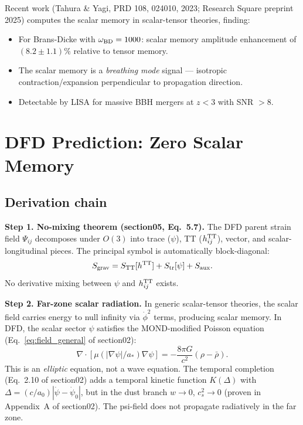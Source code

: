 \documentclass[11pt]{article}
\newcommand{\mufd}{\mu}
\newcommand{\aM}{a_0}
\begin{document}
Recent work (Tahura \& Yagi, PRD 108, 024010, 2023; Research Square
preprint 2025) computes the scalar memory in scalar-tensor theories,
finding:
\begin{itemize}[nosep]
\item For Brans-Dicke with $\omega_{\rm BD} = 1000$: scalar memory
  amplitude enhancement of $(8.2 \pm 1.1)\%$ relative to tensor memory.
\item The scalar memory is a \emph{breathing mode} signal --- isotropic
  contraction/expansion perpendicular to propagation direction.
\item Detectable by LISA for massive BBH mergers at $z < 3$ with
  SNR $> 8$.
\end{itemize}

\section{DFD Prediction: Zero Scalar Memory}

\subsection{Derivation chain}

\textbf{Step 1. No-mixing theorem (section05, Eq.~5.7).} The DFD
parent strain field $\Psi_{ij}$ decomposes under $O(3)$ into trace
($\psi$), TT ($h_{ij}^{\rm TT}$), vector, and scalar-longitudinal
pieces. The principal symbol is automatically block-diagonal:
\begin{equation}
S_{\rm grav} = S_{\rm TT}[h^{\rm TT}] + S_{\rm tr}[\psi] + S_{\rm aux}.
\end{equation}
No derivative mixing between $\psi$ and $h_{ij}^{\rm TT}$ exists.

\textbf{Step 2. Far-zone scalar radiation.} In generic scalar-tensor
theories, the scalar field carries energy to null infinity via
$\dot{\phi}^2$ terms, producing scalar memory. In DFD, the scalar
sector $\psi$ satisfies the MOND-modified Poisson equation
(Eq.~\ref{eq:field_general} of section02):
\begin{equation}
\nabla\cdot[\mufd(|\nabla\psi|/a_*)\nabla\psi] = -\frac{8\pi G}{c^2}
(\rho - \bar{\rho}).
\end{equation}
This is an \emph{elliptic} equation, not a wave equation. The temporal
completion (Eq.~2.10 of section02) adds a temporal kinetic function
$K(\Delta)$ with $\Delta = (c/\aM)|\dot{\psi} - \dot{\psi}_0|$, but
in the dust branch $w \to 0$, $c_s^2 \to 0$ (proven in Appendix~A
of section02). The psi-field does not propagate radiatively in the
far zone.
\end{document}
